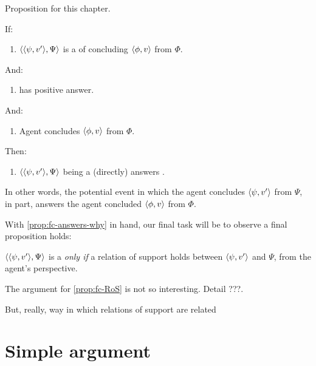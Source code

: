 \begin{note}
  Proposition for this chapter.

  \begin{proposition}
    \label{prop:fc-answers-why}
    If:
    \begin{enumerate}
    \item \(\langle \langle \psi, v' \rangle, \Psi \rangle\) is a \requ{} of concluding \(\langle \phi, v \rangle\) from \(\Phi\).
    \end{enumerate}
    And:
    \begin{enumerate}[resume]
    \item
      \qzS{} has positive answer.
    \end{enumerate}
    And:
    \begin{enumerate}[resume]
    \item
      Agent concludes \(\langle \phi, v \rangle\) from \(\Phi\).
    \end{enumerate}
    Then:
    \begin{enumerate}[resume]
    \item
      \(\langle \langle \psi, v' \rangle, \Psi \rangle\) being a \fc{} (directly) answers \qWhy{}.
    \end{enumerate}
  \end{proposition}
  In other words, the potential event in which the agent concludes \(\langle \psi, v' \rangle\) from \(\Psi\), in part, answers \qWhy{} the agent concluded \(\langle \phi, v \rangle\) from \(\Phi\).
\end{note}

\begin{note}
  With \autoref{prop:fc-answers-why} in hand, our final task will be to observe a final proposition holds:

  \begin{proposition}
    \label{prop:fc-RoS}
    \(\langle \langle \psi, v' \rangle, \Psi \rangle\) is a \fc{} \emph{only if} a relation of support holds between \(\langle \psi, v' \rangle\) and \(\Psi\), from the agent's perspective.
  \end{proposition}

  The argument for \autoref{prop:fc-RoS} is not so interesting.
  Detail {\color{red}???}.

  But, really, way in which relations of support are related 
\end{note}

\section{Simple argument}
\label{sec:simple-argument}

